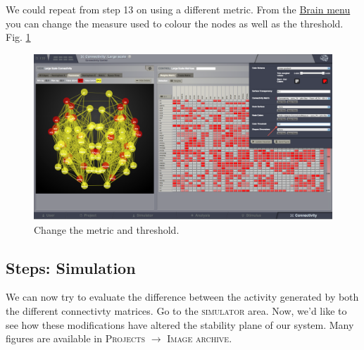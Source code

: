 \documentclass{tufte-handout}
\begin{document}
We could repeat from step 13 on using a different metric. From the \underline{Brain menu}
 you can change the measure used to colour the nodes as well as the threshold. Fig. \ref{fig:step_change_threshold}

\begin{figure}[h]
  \includegraphics[width=0.9\linewidth]{Handout_UI_ModellingStructuralLesions_ChangeNodeColourThreshold}%
  \caption{Change the metric and threshold.}%
  \label{fig:step_change_threshold}%
\end{figure}
\newpage

\subsection{Steps: Simulation}

\noindent We can now try to evaluate the difference between the activity generated by both the different connectivty matrices. 
Go to the \textsc{simulator} area. Now, we'd like to see how these modifications have altered the stability plane
of our system. Many figures are available in \textsc{Projects} $\rightarrow$ \textsc{Image archive}.
\end{document}
